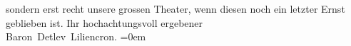 \begin{ledgroupsized}[t]{13cm}
                    sondern erst recht unsere grossen Theater, wenn diesen noch ein letzter Ernst
                    geblieben ist.\pend
           \pstart
           Ihr hochachtungsvoll ergebener{\\[\baselineskip]}\spacefill\mbox{Baron Detlev Liliencron.}\pend
           \leftskip=0em{}\endnumbering{}\end{ledgroupsized}  \newcommand{\dateiname}{L00321}\newcommand{\titel}{Detlev von Liliencron an Arthur Schnitzler, 7. 5. 1894}\newcommand{\editorInnen}{Martin Anton Müller und Gerd-Hermann Susen}
      